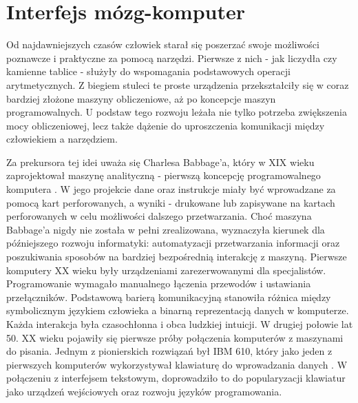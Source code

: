 \chapter{Interfejs mózg-komputer}
\label{rozdzial1}

Od najdawniejszych czasów człowiek starał się poszerzać swoje możliwości poznawcze i praktyczne za pomocą narzędzi. Pierwsze z nich - jak liczydła czy kamienne tablice - służyły do wspomagania podstawowych operacji arytmetycznych. Z biegiem stuleci te proste urządzenia przekształciły się w coraz bardziej złożone maszyny obliczeniowe, aż po koncepcje maszyn programowalnych. U podstaw tego rozwoju leżała nie tylko potrzeba zwiększenia mocy obliczeniowej, lecz także dążenie do uproszczenia komunikacji między człowiekiem a narzędziem.

Za prekursora tej idei uważa się Charlesa Babbage'a, który w XIX wieku zaprojektował maszynę analityczną - pierwszą koncepcję programowalnego komputera \cite{campbellkelly2009}. W jego projekcie dane oraz instrukcje miały być wprowadzane za pomocą kart perforowanych, a wyniki - drukowane lub zapisywane na kartach perforowanych w celu możliwości dalszego przetwarzania. Choć maszyna Babbage'a nigdy nie została w pełni zrealizowana, wyznaczyła kierunek dla późniejszego rozwoju informatyki: automatyzacji przetwarzania informacji oraz poszukiwania sposobów na bardziej bezpośrednią interakcję z maszyną. Pierwsze komputery XX wieku były urządzeniami zarezerwowanymi dla specjalistów. Programowanie wymagało manualnego łączenia przewodów i ustawiania przełączników. Podstawową barierą komunikacyjną stanowiła różnica między symbolicznym językiem człowieka a binarną reprezentacją danych w komputerze. Każda interakcja była czasochłonna i obca ludzkiej intuicji. W drugiej połowie lat 50. XX wieku pojawiły się pierwsze próby połączenia komputerów z maszynami do pisania. Jednym z pionierskich rozwiązań był IBM 610, który jako jeden z pierwszych komputerów wykorzystywał klawiaturę do wprowadzania danych \cite{campbellkelly2009}. W połączeniu z interfejsem tekstowym, doprowadziło to do popularyzacji klawiatur jako urządzeń wejściowych oraz rozwoju języków programowania.

